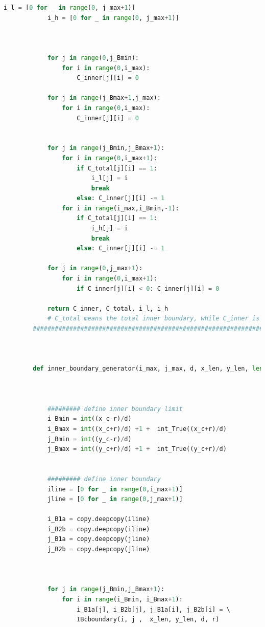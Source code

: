 \documentclass[12pt]{article}
\begin{document}
\begin{scriptsize}
\begin{lstlisting}[language=python,caption={Python code-Potential Flow}]
            i_l = [0 for _ in range(0, j_max+1)]
            i_h = [0 for _ in range(0, j_max+1)]
        
        
        
            for j in range(0,j_Bmin):
                for i in range(0,i_max):
                    C_inner[j][i] = 0
        
            for j in range(j_Bmax+1,j_max):
                for i in range(0,i_max):
                    C_inner[j][i] = 0
        
            
            for j in range(j_Bmin,j_Bmax+1):
                for i in range(0,i_max+1):
                    if C_total[j][i] == 1:
                        i_l[j] = i
                        break
                    else: C_inner[j][i] -= 1
                for i in range(i_max,i_Bmin,-1):
                    if C_total[j][i] == 1:
                        i_h[j] = i
                        break
                    else: C_inner[j][i] -= 1
        
            for j in range(0,j_max+1):
                for i in range(0,i_max+1):
                    if C_inner[j][i] < 0: C_inner[j][i] = 0
            
            return C_inner, C_total, i_l, i_h 
            # C_total means the total inner boundary, while C_inner is the points in the inner boundary
        ##########################################################################################
        
        
        
        def inner_boundary_generator(i_max, j_max, d, x_len, y_len, len, x_c, y_c, r, size):
        
            
        
            ######### define inner boundary limit
            i_Bmin = int((x_c-r)/d)
            i_Bmax = int((x_c+r)/d) +1 +  int_True((x_c+r)/d)
            j_Bmin = int((y_c-r)/d)
            j_Bmax = int((y_c+r)/d) +1 +  int_True((y_c+r)/d)
        
        
            ######### define inner boundary
            iline = [0 for _ in range(0,i_max+1)]
            jline = [0 for _ in range(0,j_max+1)]
        
            i_B1a = copy.deepcopy(iline)
            i_B2b = copy.deepcopy(iline)
            j_B1a = copy.deepcopy(jline)
            j_B2b = copy.deepcopy(jline)
        
        
        
            for j in range(j_Bmin,j_Bmax+1):
                for i in range(i_Bmin, i_Bmax+1):
                    i_B1a[j], i_B2b[j], j_B1a[i], j_B2b[i] = \ 
                    IBcboundary(i, j ,  x_len, y_len, d, r)
        

\end{lstlisting}
\end{scriptsize}
\end{document}
